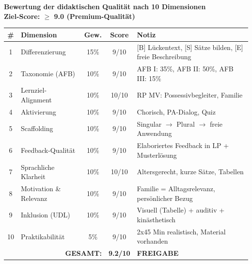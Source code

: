 \documentclass[11pt,a4paper]{article}
\begin{document}
\begin{scorebox}
\textbf{Bewertung der didaktischen Qualität nach 10 Dimensionen}\\
\textbf{Ziel-Score: $\geq$ 9.0 (Premium-Qualität)}

\vspace{1em}
\begin{tabular}{|c|l|c|c|p{4.5cm}|}
\hline
\textbf{\#} & \textbf{Dimension} & \textbf{Gew.} & \textbf{Score} & \textbf{Notiz} \\
\hline
1 & Differenzierung & 15\% & 9/10 & [B] Lückentext, [S] Sätze bilden, [E] freie Beschreibung \\
\hline
2 & Taxonomie (AFB) & 10\% & 9/10 & AFB I: 35\%, AFB II: 50\%, AFB III: 15\% \\
\hline
3 & Lernziel-Alignment & 10\% & 10/10 & RP MV: Possessivbegleiter, Familie \\
\hline
4 & Aktivierung & 10\% & 9/10 & Chorisch, PA-Dialog, Quiz \\
\hline
5 & Scaffolding & 10\% & 9/10 & Singular $\rightarrow$ Plural $\rightarrow$ freie Anwendung \\
\hline
6 & Feedback-Qualität & 10\% & 9/10 & Elaboriertes Feedback in LP + Musterlösung \\
\hline
7 & Sprachliche Klarheit & 10\% & 10/10 & Altersgerecht, kurze Sätze, Tabellen \\
\hline
8 & Motivation \& Relevanz & 10\% & 9/10 & Familie = Alltagsrelevanz, persönlicher Bezug \\
\hline
9 & Inklusion (UDL) & 10\% & 9/10 & Visuell (Tabelle) + auditiv + kinästhetisch \\
\hline
10 & Praktikabilität & 5\% & 9/10 & 2x45 Min realistisch, Material vorhanden \\
\hline
\multicolumn{3}{|r|}{\textbf{GESAMT:}} & \textbf{9.2/10} & \textcolor{successgreen}{\textbf{FREIGABE}} \\
\hline
\end{tabular}
\end{scorebox}
\end{document}
